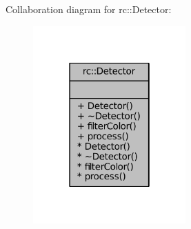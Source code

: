 Collaboration diagram for rc\+:\+:Detector\+:\nopagebreak
\begin{figure}[H]
\begin{center}
\leavevmode
\includegraphics[width=166pt]{classrc_1_1Detector__coll__graph}
\end{center}
\end{figure}
